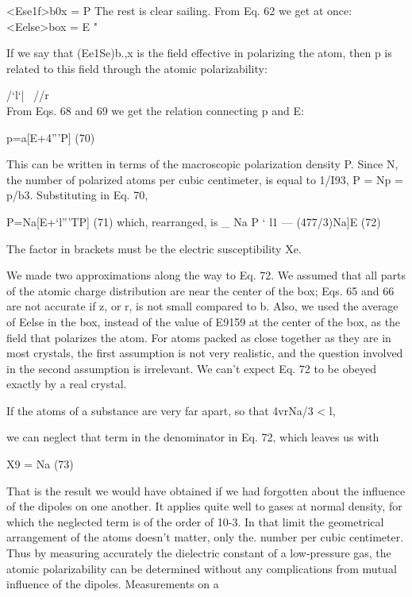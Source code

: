 {{<Ese1f>b0x =  P 
The rest is clear sailing. From Eq. 62 we get at once:
<Eelse>box = E "  

If we say that (Ee1Se)b.,x is the field effective in polarizing the atom,
then p is related to this field through the atomic polarizability:

/‘l‘| \ //r\\

From Eqs. 68 and 69 we get the relation connecting p and E:

\begin{equation}
\end{equation}
p=a[E+4'''P] (70)

This can be written in terms of the macroscopic polarization density
P. Since N, the number of polarized atoms per cubic centimeter, is
equal to 1/I93, P = Np = p/b3. Substituting in Eq. 70,

\begin{equation}
\end{equation}
P=Na[E+‘l'''TP] (71)
which, rearranged, is
_ Na
P ‘ l1  ---  (477/3)Na]E (72)

The factor in brackets must be the electric susceptibility Xe.

We made two approximations along the way to Eq. 72. We assumed
that all parts of the atomic charge distribution are near the
center of the box; Eqs. 65 and 66 are not accurate if z, or r, is not
small compared to b. Also, we used the average of Eelse in the box,
instead of the value of E9159 at the center of the box, as the field that
polarizes the atom. For atoms packed as close together as they are
in most crystals, the first assumption is not very realistic, and the
question involved in the second assumption is irrelevant. We can't
expect Eq. 72 to be obeyed exactly by a real crystal.

If the atoms of a substance are very far apart, so that 4vrNa/3 < l,

we can neglect that term in the denominator in Eq. 72, which leaves
us with

\begin{equation}
\end{equation}
X9 = Na (73)

That is the result we would have obtained if we had forgotten about
the influence of the dipoles on one another. It applies quite well to
gases at normal density, for which the neglected term is of the order
of 10-3. In that limit the geometrical arrangement of the atoms
doesn't matter, only the. number per cubic centimeter. Thus by
measuring accurately the dielectric constant of a low-pressure gas,
the atomic polarizability can be determined without any complications
from mutual influence of the dipoles. Measurements on a

}}

